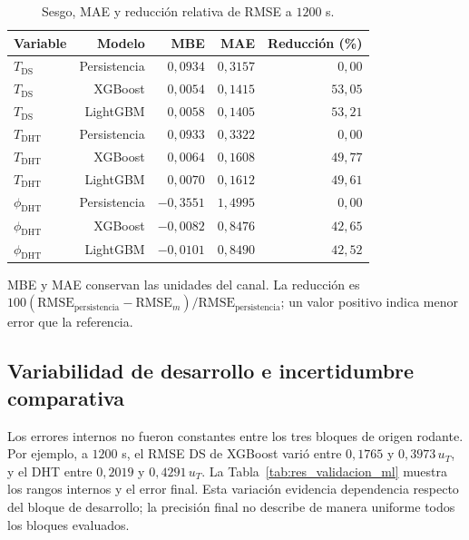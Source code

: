 \begin{table}[htbp]
\centering
\caption{Sesgo, MAE y reducción relativa de RMSE a $1200$ s.}
\label{tab:res_sesgo_mae}
\small
\setlength{\tabcolsep}{5pt}
\begin{tabular}{lrrrr}
\toprule
Variable & Modelo & MBE & MAE & Reducción (\%) \\
\midrule
$T_{\mathrm{DS}}$ & Persistencia & $0{,}0934$ & $0{,}3157$ & $0{,}00$ \\
$T_{\mathrm{DS}}$ & XGBoost & $0{,}0054$ & $0{,}1415$ & $53{,}05$ \\
$T_{\mathrm{DS}}$ & LightGBM & $0{,}0058$ & $0{,}1405$ & $53{,}21$ \\
$T_{\mathrm{DHT}}$ & Persistencia & $0{,}0933$ & $0{,}3322$ & $0{,}00$ \\
$T_{\mathrm{DHT}}$ & XGBoost & $0{,}0064$ & $0{,}1608$ & $49{,}77$ \\
$T_{\mathrm{DHT}}$ & LightGBM & $0{,}0070$ & $0{,}1612$ & $49{,}61$ \\
$\phi_{\mathrm{DHT}}$ & Persistencia & $-0{,}3551$ & $1{,}4995$ & $0{,}00$ \\
$\phi_{\mathrm{DHT}}$ & XGBoost & $-0{,}0082$ & $0{,}8476$ & $42{,}65$ \\
$\phi_{\mathrm{DHT}}$ & LightGBM & $-0{,}0101$ & $0{,}8490$ & $42{,}52$ \\
\bottomrule
\end{tabular}
\par\vspace{3pt}
\begin{minipage}{0.98\textwidth}\footnotesize
MBE y MAE conservan las unidades del canal. La reducción es $100(\mathrm{RMSE}_{\mathrm{persistencia}}-\mathrm{RMSE}_{m})/\mathrm{RMSE}_{\mathrm{persistencia}}$; un valor positivo indica menor error que la referencia.
\end{minipage}
\end{table}


\subsection{Variabilidad de desarrollo e incertidumbre comparativa}

Los errores internos no fueron constantes entre los tres bloques de origen rodante. Por ejemplo, a $1200$ s, el RMSE DS de XGBoost varió entre $0{,}1765$ y $0{,}3973\,u_T$, y el DHT entre $0{,}2019$ y $0{,}4291\,u_T$. La Tabla~\ref{tab:res_validacion_ml} muestra los rangos internos y el error final. Esta variación evidencia dependencia respecto del bloque de desarrollo; la precisión final no describe de manera uniforme todos los bloques evaluados.

